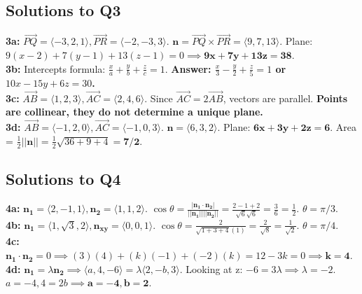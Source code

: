 \documentclass[11pt]{article}
\begin{document}
\subsection{Solutions to Q3}
\textbf{3a:} $\vec{PQ} = \langle -3, 2, 1 \rangle, \vec{PR} = \langle -2, -3, 3 \rangle$. $\mathbf{n} = \vec{PQ} \times \vec{PR} = \langle 9, 7, 13 \rangle$. Plane: $9(x-2)+7(y-1)+13(z-1)=0 \implies \mathbf{9x+7y+13z=38}$.\\
\textbf{3b:} Intercepts formula: $\frac{x}{a} + \frac{y}{b} + \frac{z}{c} = 1$. \textbf{Answer: $\frac{x}{3} - \frac{y}{2} + \frac{z}{5} = 1$ or $10x - 15y + 6z = 30$.}\\
\textbf{3c:} $\vec{AB} = \langle 1, 2, 3 \rangle, \vec{AC} = \langle 2, 4, 6 \rangle$. Since $\vec{AC} = 2\vec{AB}$, vectors are parallel. \textbf{Points are collinear, they do not determine a unique plane.}\\
\textbf{3d:} $\vec{AB} = \langle -1, 2, 0 \rangle, \vec{AC} = \langle -1, 0, 3 \rangle$. $\mathbf{n} = \langle 6, 3, 2 \rangle$. Plane: $\mathbf{6x+3y+2z=6}$. Area = $\frac{1}{2}||\mathbf{n}|| = \frac{1}{2}\sqrt{36+9+4} = \mathbf{7/2}$.

\subsection{Solutions to Q4}
\textbf{4a:} $\mathbf{n_1} = \langle 2,-1,1 \rangle, \mathbf{n_2} = \langle 1,1,2 \rangle$. $\cos\theta = \frac{|\mathbf{n_1} \cdot \mathbf{n_2}|}{||\mathbf{n_1}|| ||\mathbf{n_2}||} = \frac{2-1+2}{\sqrt{6}\sqrt{6}} = \frac{3}{6} = \frac{1}{2}$. \textbf{$\theta = \pi/3$}.\\
\textbf{4b:} $\mathbf{n_1} = \langle 1, \sqrt{3}, 2 \rangle, \mathbf{n_{xy}} = \langle 0,0,1 \rangle$. $\cos\theta = \frac{2}{\sqrt{1+3+4}(1)} = \frac{2}{\sqrt{8}} = \frac{1}{\sqrt{2}}$. \textbf{$\theta = \pi/4$}.\\
\textbf{4c:} $\mathbf{n_1} \cdot \mathbf{n_2} = 0 \implies (3)(4) + (k)(-1) + (-2)(k) = 12 - 3k = 0 \implies \mathbf{k = 4}$.\\
\textbf{4d:} $\mathbf{n_1} = \lambda \mathbf{n_2} \implies \langle a, 4, -6 \rangle = \lambda \langle 2, -b, 3 \rangle$. Looking at z: $-6 = 3\lambda \implies \lambda = -2$. $a = -4, 4 = 2b \implies \mathbf{a = -4, b = 2}$.
\end{document}

